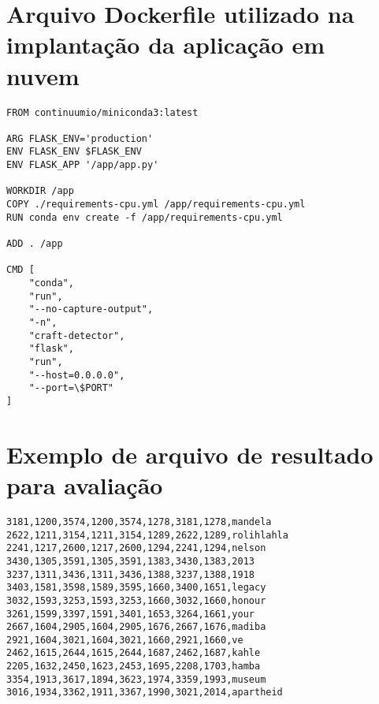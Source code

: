 \begin{apendicesenv}
\chapter{Arquivo Dockerfile utilizado na implantação da aplicação em nuvem}\label{apd:dockerfile}
\begin{verbatim}
FROM continuumio/miniconda3:latest

ARG FLASK_ENV='production'
ENV FLASK_ENV $FLASK_ENV
ENV FLASK_APP '/app/app.py'

WORKDIR /app
COPY ./requirements-cpu.yml /app/requirements-cpu.yml
RUN conda env create -f /app/requirements-cpu.yml

ADD . /app

CMD [
    "conda",
    "run",
    "--no-capture-output",
    "-n",
    "craft-detector",
    "flask",
    "run",
    "--host=0.0.0.0",
    "--port=\$PORT"
]
\end{verbatim}

\chapter{Exemplo de arquivo de resultado para avaliação}\label{apd:exe_resultado}
\begin{verbatim}
3181,1200,3574,1200,3574,1278,3181,1278,mandela
2622,1211,3154,1211,3154,1289,2622,1289,rolihlahla
2241,1217,2600,1217,2600,1294,2241,1294,nelson
3430,1305,3591,1305,3591,1383,3430,1383,2013
3237,1311,3436,1311,3436,1388,3237,1388,1918
3403,1581,3598,1589,3595,1660,3400,1651,legacy
3032,1593,3253,1593,3253,1660,3032,1660,honour
3261,1599,3397,1591,3401,1653,3264,1661,your
2667,1604,2905,1604,2905,1676,2667,1676,madiba
2921,1604,3021,1604,3021,1660,2921,1660,ve
2462,1615,2644,1615,2644,1687,2462,1687,kahle
2205,1632,2450,1623,2453,1695,2208,1703,hamba
3354,1913,3617,1894,3623,1974,3359,1993,museum
3016,1934,3362,1911,3367,1990,3021,2014,apartheid
\end{verbatim}


\end{apendicesenv}
